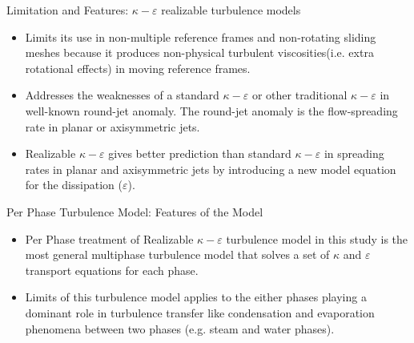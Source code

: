 \begin{frame}{Limitation and Features: $\kappa-\varepsilon$ realizable turbulence models}
   \begin{itemize}
       \item Limits its use in non-multiple reference frames and non-rotating sliding meshes because it produces non-physical turbulent viscosities(i.e. extra rotational effects) in moving reference frames.
       \item Addresses the weaknesses of a standard $\kappa-\varepsilon$ or other traditional $\kappa-\varepsilon$ in well-known round-jet anomaly. The round-jet anomaly is the flow-spreading rate in planar or axisymmetric jets.
       \item Realizable $\kappa-\varepsilon$ gives better prediction than standard $\kappa-\varepsilon$  in spreading rates in planar and axisymmetric jets by introducing a new model equation for the dissipation ($\varepsilon$).
   \end{itemize}
\end{frame}

\begin{frame}{Per Phase Turbulence Model: Features of the Model}
\begin{itemize}
    \item Per Phase treatment of Realizable $\kappa-\varepsilon$ turbulence model in this study is the most general multiphase turbulence model that solves a set of $\kappa$ and $\varepsilon$ transport equations for each phase.
    \item Limits of this turbulence model applies to the either phases playing a dominant role in turbulence transfer like condensation and evaporation phenomena between two phases (e.g. steam and water phases).
\end{itemize}
\end{frame}